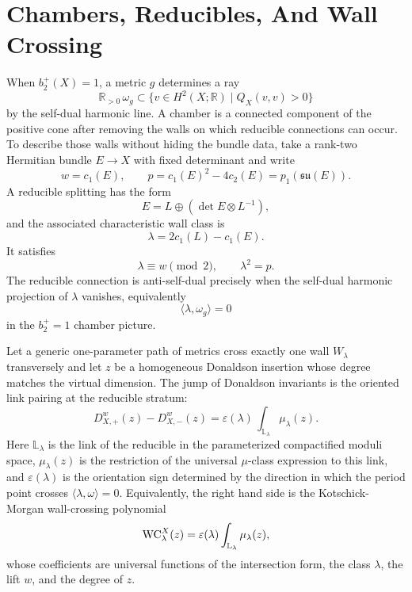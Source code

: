 \section{Chambers, Reducibles, And Wall Crossing}

When \(b_2^+(X)=1\), a metric \(g\) determines a ray
\begin{equation}
  \mathbb R_{>0}\,\omega_g
  \subset
  \{v\in H^2(X;\mathbb R)\mid Q_X(v,v)>0\}
  \label{eq:period-point-ray}
\end{equation}
by the self-dual harmonic line.  A chamber is a connected component of the
positive cone after removing the walls on which reducible connections can
occur.  To describe those walls without hiding the bundle data, take a
rank-two Hermitian bundle \(E\to X\) with fixed determinant and write
\[
  w=c_1(E),\qquad
  p=c_1(E)^2-4c_2(E)=p_1(\mathfrak{su}(E)).
\]
A reducible splitting has the form
\[
  E=L\oplus(\det E\otimes L^{-1}),
\]
and the associated characteristic wall class is
\begin{equation}
  \lambda=2c_1(L)-c_1(E).
  \label{eq:donaldson-wall-class}
\end{equation}
It satisfies
\begin{equation}
  \lambda\equiv w\pmod2,\qquad \lambda^2=p.
  \label{eq:donaldson-wall-class-constraints}
\end{equation}
The reducible connection is anti-self-dual precisely when the self-dual
harmonic projection of \(\lambda\) vanishes, equivalently
\begin{equation}
  \langle \lambda,\omega_g\rangle=0
  \label{eq:donaldson-wall-equation}
\end{equation}
in the \(b_2^+=1\) chamber picture.

\begin{quotedtheorem}
\label{qt:donaldson-wall-crossing-link-form}
Let a generic one-parameter path of metrics cross exactly one wall
\(W_\lambda\) transversely and let \(z\) be a homogeneous Donaldson insertion
whose degree matches the virtual dimension.  The jump of Donaldson
invariants is the oriented link pairing at the reducible stratum:
\begin{equation}
  D_{X,+}^w(z)-D_{X,-}^w(z)
  =
  \varepsilon(\lambda)\,
  \int_{\mathbb L_\lambda}
  \mu_\lambda(z).
  \label{eq:donaldson-wall-crossing-link}
\end{equation}
Here \(\mathbb L_\lambda\) is the link of the reducible in the
parameterized compactified moduli space, \(\mu_\lambda(z)\) is the
restriction of the universal \(\mu\)-class expression to this link, and
\(\varepsilon(\lambda)\) is the orientation sign determined by the direction
in which the period point crosses
\(\langle\lambda,\omega\rangle=0\).  Equivalently, the right hand side is the
Kotschick-Morgan wall-crossing polynomial
\begin{equation}
  {\rm WC}_\lambda^X(z)
  =
  \varepsilon(\lambda)
  \int_{\mathbb L_\lambda}\mu_\lambda(z),
  \label{eq:kotschick-morgan-link-definition}
\end{equation}
whose coefficients are universal functions of the intersection form, the
class \(\lambda\), the lift \(w\), and the degree of \(z\).
\end{quotedtheorem}

